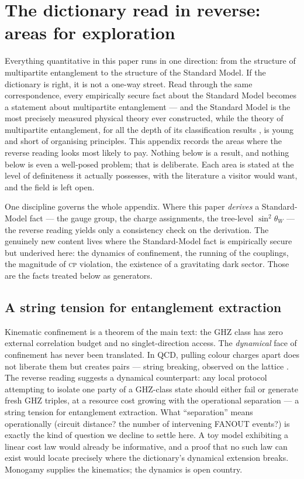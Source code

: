 \section{The dictionary read in reverse: areas for exploration}
\label{app:reverse-flow}

Everything quantitative in this paper runs in one direction: from the structure of
multipartite entanglement to the structure of the Standard Model. If the dictionary is
right, it is not a one-way street. Read through the same correspondence, every
empirically secure fact about the Standard Model becomes a statement about multipartite
entanglement --- and the Standard Model is the most precisely measured physical theory
ever constructed, while the theory of multipartite entanglement, for all the depth of its
classification results \autocite{durvidalcirac2000three, coeckekissinger2010compositional},
is young and short of organising principles. This appendix records the areas where the
reverse reading looks most likely to pay. Nothing below is a result, and nothing below is
even a well-posed problem; that is deliberate. Each area is stated at the level of
definiteness it actually possesses, with the literature a visitor would want, and the
field is left open.

One discipline governs the whole appendix. Where this paper \emph{derives} a
Standard-Model fact --- the gauge group, the charge assignments, the tree-level
$\sin^{2}\theta_{W}$ --- the reverse reading yields only a consistency check on the
derivation. The genuinely new content lives where the Standard-Model fact is empirically
secure but underived here: the dynamics of confinement, the running of the couplings, the
magnitude of \textsc{cp} violation, the existence of a gravitating dark sector. Those are
the facts treated below as generators.

\subsection{A string tension for entanglement extraction}
\label{app:rev-string}

Kinematic confinement is a theorem of the main text: the GHZ class has zero external
correlation budget and no singlet-direction access. The \emph{dynamical} face of
confinement has never been translated. In QCD, pulling colour charges apart does not
liberate them but creates pairs --- string breaking, observed on the lattice
\autocite{bali2005string}. The reverse reading suggests a dynamical counterpart: any
local protocol attempting to isolate one party of a GHZ-class state should either fail or
generate fresh GHZ triples, at a resource cost growing with the operational separation
--- a string tension for entanglement extraction. What ``separation'' means operationally
(circuit distance? the number of intervening FANOUT events?) is exactly the kind of
question we decline to settle here. A toy model exhibiting a linear cost law would
already be informative, and a proof that no such law can exist would locate precisely
where the dictionary's dynamical extension breaks. Monogamy
\autocite{coffmankunduwootters2000} supplies the kinematics; the dynamics is open
country.

